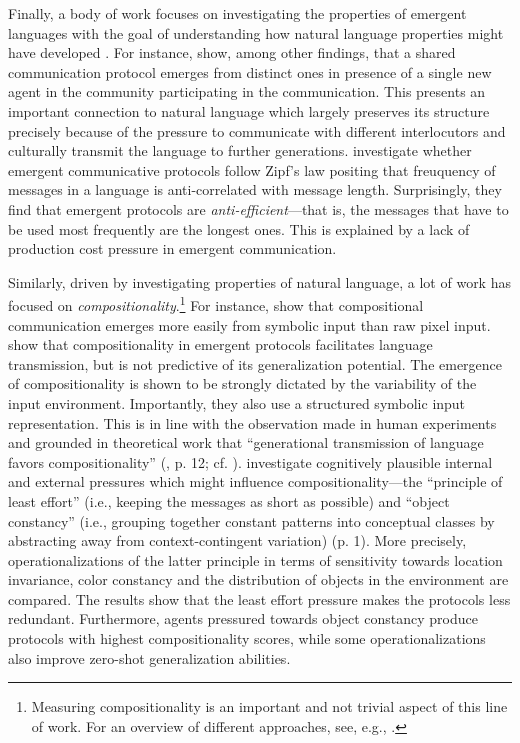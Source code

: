 Finally, a body of work focuses on investigating the properties of emergent languages with the goal of understanding how natural language properties might have developed \parencite{lazaridou2020emergent}. For instance, \cite{graesser2019emergent} show, among other findings, that a shared communication protocol emerges from distinct ones in presence of a single new agent in the community participating in the communication. This presents an important connection to natural language which largely preserves its structure precisely because of the pressure to communicate with different interlocutors and culturally transmit the language to further generations.  \cite{chaabouni2019anti} investigate whether emergent communicative protocols follow Zipf's law positing that freuquency of messages in a language is anti-correlated with message length. Surprisingly, they find that emergent protocols are \textit{anti-efficient}---that is, the messages that have to be used most frequently are the longest ones. This is explained by a lack of production cost pressure in emergent communication.

Similarly, driven by investigating properties of natural language, a lot of work has focused on \textit{compositionality}.\footnote{Measuring compositionality is an important and not trivial aspect of this line of work. For an overview of different approaches, see, e.g., \cite{lazaridou2020emergent}.} For instance, \cite{lazaridou2018emergence} show that compositional communication emerges more easily from symbolic input than raw pixel input. 
\cite{chaabouni2020compositionality} show that compositionality in emergent protocols facilitates language transmission, but is not predictive of its generalization potential. The emergence of compositionality is shown to be strongly dictated by the variability of the input environment. Importantly, they also use a structured symbolic input representation.
This is in line with the observation made in human experiments and grounded in theoretical work that ``generational transmission of language favors compositionality'' (\cite{lazaridou2020emergent}, p. 12; cf. \cite{kirby2014iterated}).
\cite{luna2020internal} investigate cognitively plausible internal and external pressures which might influence compositionality---the ``principle of least effort'' (i.e., keeping the messages as short as possible) and ``object constancy'' (i.e., grouping together constant patterns into conceptual classes by abstracting away from context-contingent variation) (p. 1). More precisely, operationalizations of the latter principle in terms of sensitivity towards location invariance, color constancy and the distribution of objects in the environment are compared. The results show that the least effort pressure makes the protocols less redundant. Furthermore, agents pressured towards object constancy produce protocols with highest compositionality scores, while some operationalizations also improve zero-shot generalization abilities. 

